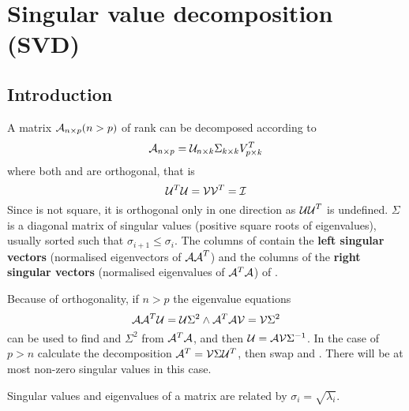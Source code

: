 \section{Singular value decomposition (SVD)}

\subsection{Introduction}

A matrix \(\mathcal{A}_{n\times p} (n > p) \) of rank  can be decomposed according to
\begin{equation}
  \mathcal{A}_{n\times p} = \mathcal{U}_{n\times k} \Sigma_{k\times k} V^T_{p\times k}
\end{equation}
where both  and  are orthogonal, that is
\begin{equation}
  \mathcal{U}^T \mathcal{U} = \mathcal{V} \mathcal{V}^T = \mathcal{I}
\end{equation}
Since  is not square, it is orthogonal only in one direction as \(\mathcal{UU}^T \) is undefined. \(\Sigma \) is a diagonal matrix of singular values (positive square roots of eigenvalues), usually sorted such that \(\sigma_{i+1} \leq \sigma_i \). The columns of  contain the  \textbf{left singular vectors} (normalised eigenvectors of \(\mathcal{AA}^T \)) and the  columns of  the \textbf{right singular vectors} (normalised eigenvalues of \(\mathcal{A}^T\mathcal{A} \)) of .

Because of orthogonality, if \(n > p \) the eigenvalue equations
\begin{equation}
  \mathcal{AA}^T\mathcal{U} = \mathcal{U}\Sigma^2 \wedge \mathcal{A}^T\mathcal{AV} = \mathcal{V} \Sigma^2
\end{equation}
can be used to find  and \(\Sigma^2 \) from \(\mathcal{A}^T\mathcal{A} \), and then \(\mathcal{U} = \mathcal{AV}\Sigma^{-1} \). In the case of \(p > n \) calculate the decomposition \(\mathcal{A}^T = \mathcal{V} \Sigma \mathcal{U}^T \), then swap  and . There will be at most  non-zero singular values in this case.

Singular values and eigenvalues of a matrix are related by \(\sigma_i = \sqrt{\lambda_i} \).

